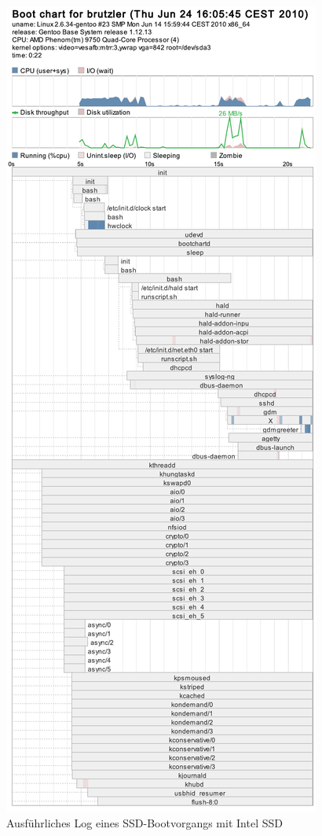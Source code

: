 \begin{figure}[H]\centering
	\includegraphics[scale=0.4]{figures/appendix/bootchart-ssd_intel}
    \caption{Ausführliches Log eines SSD-Bootvorgangs mit Intel SSD}
    \label{img:bootchart-ssd:intel}
\end{figure}

